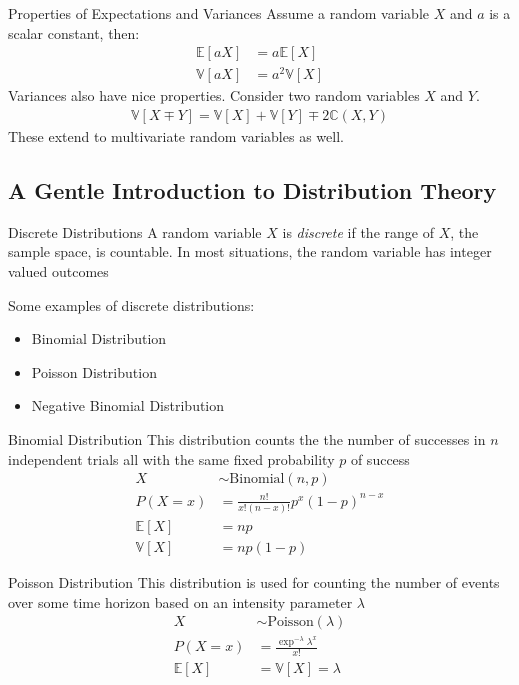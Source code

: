 \documentclass{beamer}
\begin{document}
\begin{frame}{Properties of Expectations and Variances}
Assume a random variable $X$ and $a$ is a scalar constant, then:
\begin{align*}
\mathbb{E}[aX] &= a \mathbb{E}[X] \\
\mathbb{V}[aX] &= a^{2} \mathbb{V}[X]
\end{align*}
Variances also have nice properties. Consider two random variables $X$ and $Y$.
\begin{align*}
\mathbb{V}[X \mp Y] = \mathbb{V}[X] + \mathbb{V}[Y] \mp 2\mathbb{C}(X,Y)
\end{align*}
These extend to multivariate random variables as well.
\end{frame}

\subsection{A Gentle Introduction to Distribution Theory}

\begin{frame}{Discrete Distributions}
A random variable $X$ is \emph{discrete} if the range of $X$, the sample space, is countable. In most situations, the random variable has integer valued outcomes
\newline

Some examples of discrete distributions:
\begin{itemize}
\item{Binomial Distribution}
\item{Poisson Distribution}
\item{Negative Binomial Distribution}
\end{itemize}
\end{frame}


\begin{frame}{Binomial Distribution}
This distribution counts the the number of successes in $n$ independent trials all with the same fixed probability $p$ of success
\begin{align*}
X &\sim \mathrm{Binomial}(n, p) \\
P(X  = x) &= \frac{n!}{x!(n-x)!} p^{x}(1-p)^{n-x} \\
\mathbb{E}[X] &= np \\
\mathbb{V}[X] &= n p (1-p)
\end{align*}
\end{frame}

\begin{frame}{Poisson Distribution}
This distribution is used for counting the number of events over some time horizon based on an intensity parameter $\lambda$
\begin{align*}
X &\sim \mathrm{Poisson}(\lambda)\\
P(X = x) &= \frac{\exp^{-\lambda}\lambda^{x}}{x!}\\
\mathbb{E}[X] &= \mathbb{V}[X] = \lambda
\end{align*}
\end{frame}
\end{document}
